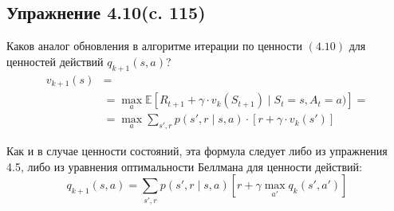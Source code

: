 \subsection{Упражнение 4.10(c. 115)}
Каков аналог обновления в  алгоритме итерации по ценности
$(4.10)$ для ценностей действий $q_{k+1}(s, a)$? 
\begin{align*}
    v_{k+1}(s) &= \\
    &=\max_a\mathbb{E}\left[ R_{t+1}+\gamma\cdot v_{k}(S_{t+1} )\mid S_t=s, A_t=a) \right] =\\
    &= \max_a\sum_{s',r}p(s',r\mid s,a)\cdot\left[r + \gamma\cdot v_k(s')\right]
\tag{4.10}
\end{align*}
\begin{solution}
    Как и в случае ценности состояний, эта формула следует либо из упражнения 4.5, либо из уравнения оптимальности Беллмана для ценности действий:
    \[
        q_{k+1}(s,a)
        =
        \sum_{s',r}
        p(s',r \mid s,a)
        \left[
        r + \gamma \max_{a'} q_k(s', a')
        \right]
    \]
\end{solution}

